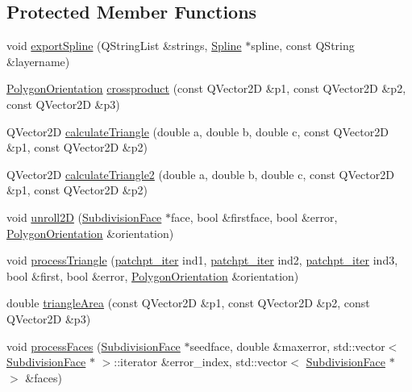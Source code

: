 \subsection*{Protected Member Functions}
\begin{DoxyCompactItemize}
\item 
void \hyperlink{classShipCAD_1_1DevelopedPatch_aba8c1bb34e8690b2192b3cc2c389bad9}{export\+Spline} (Q\+String\+List \&strings, \hyperlink{classShipCAD_1_1Spline}{Spline} $\ast$spline, const Q\+String \&layername)
\item 
\hyperlink{namespaceShipCAD_a22a4489ec7a6505c3c30fa7562175ca4}{Polygon\+Orientation} \hyperlink{classShipCAD_1_1DevelopedPatch_a3210c1289d04ec78d1a13217b5ea742a}{crossproduct} (const Q\+Vector2D \&p1, const Q\+Vector2D \&p2, const Q\+Vector2D \&p3)
\item 
Q\+Vector2D \hyperlink{classShipCAD_1_1DevelopedPatch_aaa57f091d14d72af632b838a1cfd39c0}{calculate\+Triangle} (double a, double b, double c, const Q\+Vector2D \&p1, const Q\+Vector2D \&p2)
\item 
Q\+Vector2D \hyperlink{classShipCAD_1_1DevelopedPatch_a3c4527d0a0fcafff2b506aabef67a43e}{calculate\+Triangle2} (double a, double b, double c, const Q\+Vector2D \&p1, const Q\+Vector2D \&p2)
\item 
void \hyperlink{classShipCAD_1_1DevelopedPatch_af5563e813910e11a78126223a6635faf}{unroll2D} (\hyperlink{classShipCAD_1_1SubdivisionFace}{Subdivision\+Face} $\ast$face, bool \&firstface, bool \&error, \hyperlink{namespaceShipCAD_a22a4489ec7a6505c3c30fa7562175ca4}{Polygon\+Orientation} \&orientation)
\item 
void \hyperlink{classShipCAD_1_1DevelopedPatch_ac9cab6969a888b9a1833271ce1fb3dde}{process\+Triangle} (\hyperlink{namespaceShipCAD_a69b081dd347722fb55da2f3958db5d08}{patchpt\+\_\+iter} ind1, \hyperlink{namespaceShipCAD_a69b081dd347722fb55da2f3958db5d08}{patchpt\+\_\+iter} ind2, \hyperlink{namespaceShipCAD_a69b081dd347722fb55da2f3958db5d08}{patchpt\+\_\+iter} ind3, bool \&first, bool \&error, \hyperlink{namespaceShipCAD_a22a4489ec7a6505c3c30fa7562175ca4}{Polygon\+Orientation} \&orientation)
\item 
double \hyperlink{classShipCAD_1_1DevelopedPatch_abd307ac53a6a3ab54b17c646d6f0bad5}{triangle\+Area} (const Q\+Vector2D \&p1, const Q\+Vector2D \&p2, const Q\+Vector2D \&p3)
\item 
void \hyperlink{classShipCAD_1_1DevelopedPatch_ad3a9b8115925272b974b003a27a7f4c7}{process\+Faces} (\hyperlink{classShipCAD_1_1SubdivisionFace}{Subdivision\+Face} $\ast$seedface, double \&maxerror, std\+::vector$<$ \hyperlink{classShipCAD_1_1SubdivisionFace}{Subdivision\+Face} $\ast$ $>$\+::iterator \&error\+\_\+index, std\+::vector$<$ \hyperlink{classShipCAD_1_1SubdivisionFace}{Subdivision\+Face} $\ast$ $>$ \&faces)
\end{DoxyCompactItemize}
